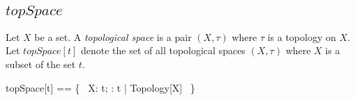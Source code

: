 \documentclass[11pt, oneside]{article}
\begin{document}
\subsection{$topSpace$}

Let $X$ be a set.
A {\it topological space} is a pair $(X, \tau)$ where $\tau$ is a topology on $X$.
Let $topSpace[t]$ denote the set of all topological spaces $(X,\tau)$ where $X$ is a subset of the set $t$.

\begin{zed}
	topSpace[t] == \{~ X: \power t; \tau: \family t | Topology[X] ~\}
\end{zed}

\begin{example}


\end{example}

\printbibliography
\end{document}
